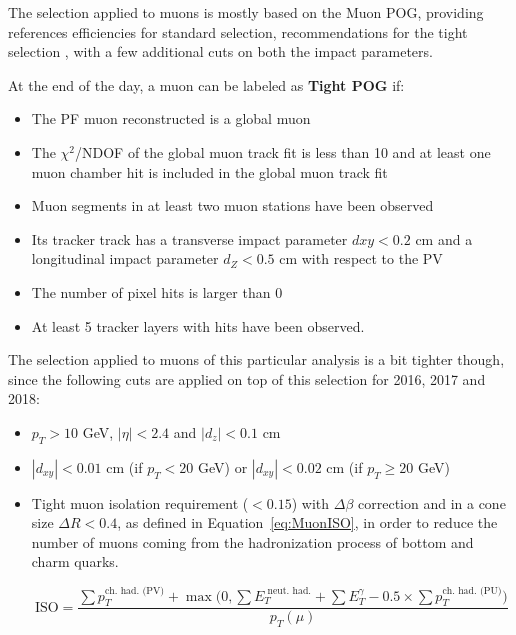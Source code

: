 \documentclass[a4paper, 10pt, openright]{report}
\begin{document}
The selection applied to muons is mostly based on the Muon \ac{POG}, providing references efficiencies for standard selection, recommendations for the tight selection \cite{MuonPOG}, with a few additional cuts on both the impact parameters. 

At the end of the day, a muon can be labeled as \textbf{Tight \ac{POG}} if:
\begin{itemize}
\item The \ac{PF} muon reconstructed is a global muon
\item The $\chi^2$/NDOF of the global muon track fit is less than 10 and at least one muon chamber hit is included in the global muon track fit%
\item Muon segments in at least two muon stations have been observed
\item Its tracker track has a transverse impact parameter $dxy < 0.2$ cm and a longitudinal impact parameter $d_Z < 0.5$ cm with respect to the \ac{PV} 
\item The number of pixel hits is larger than 0
\item At least 5 tracker layers with hits have been observed.
\end{itemize}

The selection applied to muons of this particular analysis is a bit tighter though, since the following cuts are applied on top of this selection for 2016, 2017 and 2018:

\begin{itemize}
\item $p_T > 10$ GeV, $|\eta| < 2.4$ and $|d_z| < 0.1$ cm
\item $|d_{xy}| < 0.01$ cm (if $p_T < 20$ GeV) or $|d_{xy}| < 0.02$ cm (if $p_T \geq 20$ GeV)
\item Tight muon isolation requirement ($< 0.15$) with $\Delta \beta$ correction and in a cone size $\Delta R < 0.4$, as defined in Equation~\ref{eq:MuonISO}, in order to reduce the number of muons coming from the hadronization process of bottom and charm quarks.

\begin{equation}
\label{eq:MuonISO}
\text{ISO} = \frac{\sum p_T^{\text{ch. had. (PV)}} + \max \big (0, \sum E_T^{\text{ neut. had.}} + \sum E_T^{\gamma}  - 0.5 \times \sum p_T^\text{ch. had. (PU)} \big )}{p_T(\mu)}
\end{equation}

\end{itemize}
\end{document}
